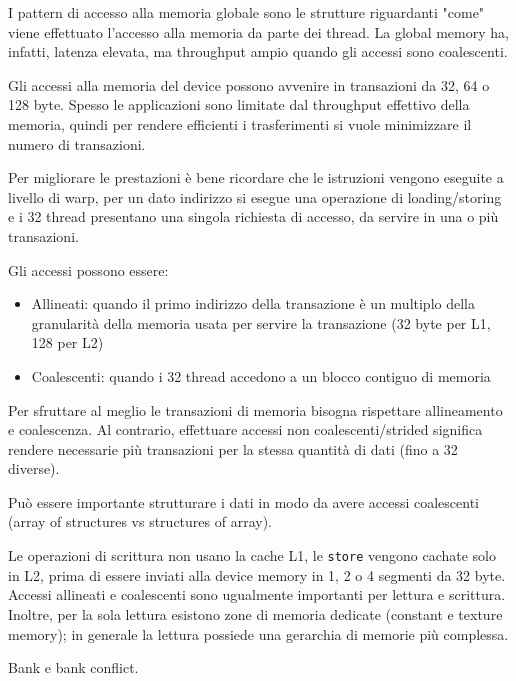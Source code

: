 \begin{questions}
\begin{solution}
        I pattern di accesso alla memoria globale sono le strutture riguardanti "come" viene effettuato l'accesso alla memoria da parte dei thread. La global memory ha, infatti, latenza elevata, ma throughput ampio quando gli accessi sono coalescenti.
        
        Gli accessi alla memoria del device possono avvenire in transazioni da 32, 64 o 128 byte. Spesso le applicazioni sono limitate dal throughput effettivo della memoria, quindi per rendere efficienti i trasferimenti si vuole minimizzare il numero di transazioni. 
        
        Per migliorare le prestazioni è bene ricordare che le istruzioni vengono eseguite a livello di warp, per un dato indirizzo si esegue una operazione di loading/storing e i 32 thread presentano una singola richiesta di accesso, da servire in una o più transazioni.
        
        Gli accessi possono essere:
        \begin{itemize}
            \item Allineati: quando il primo indirizzo della transazione è un multiplo della granularità della memoria usata per servire la transazione (32 byte per L1, 128 per L2)
            
            \item Coalescenti: quando i 32 thread accedono a un blocco contiguo di memoria
        \end{itemize}
        
        Per sfruttare al meglio le transazioni di memoria bisogna rispettare allineamento e coalescenza. Al contrario, effettuare accessi non coalescenti/strided significa rendere necessarie più transazioni per la stessa quantità di dati (fino a 32 diverse).
        
        Può essere importante strutturare i dati in modo da avere accessi coalescenti (array of structures vs structures of array).
        
        Le operazioni di scrittura non usano la cache L1, le \texttt{store} vengono cachate solo in L2, prima di essere inviati alla device memory in 1, 2 o 4 segmenti da 32 byte. Accessi allineati e coalescenti sono ugualmente importanti per lettura e scrittura. Inoltre, per la sola lettura esistono zone di memoria dedicate (constant e texture memory); in generale la lettura possiede una gerarchia di memorie più complessa.
    \end{solution}
    
    \question Bank e bank conflict.
    

\end{questions}
